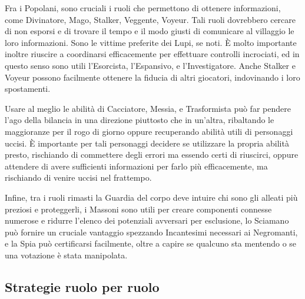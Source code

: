 \documentclass[a4paper,10pt]{article}
\begin{document}
Fra i Popolani, sono cruciali i ruoli che permettono di ottenere informazioni, come Divinatore, Mago, Stalker, Veggente, Voyeur. Tali ruoli dovrebbero cercare di non esporsi e di trovare il tempo e il modo giusti di comunicare al villaggio le loro informazioni. Sono le vittime preferite dei Lupi, se noti. È molto importante inoltre riuscire a coordinarsi efficacemente per effettuare controlli incrociati, ed in questo senso sono utili l'Esorcista, l'Espansivo, e l'Investigatore. Anche Stalker e Voyeur possono facilmente ottenere la fiducia di altri giocatori, indovinando i loro spostamenti.

Usare al meglio le abilità di Cacciatore, Messia, e Trasformista può far pendere l'ago della bilancia in una direzione piuttosto che in un'altra, ribaltando le maggioranze per il rogo di giorno oppure recuperando abilità utili di personaggi uccisi. È importante per tali personaggi decidere se utilizzare la propria abilità presto, rischiando di commettere degli errori ma essendo certi di riuscirci, oppure attendere di avere sufficienti informazioni per farlo più efficacemente, ma rischiando di venire uccisi nel frattempo.

Infine, tra i ruoli rimasti la Guardia del corpo deve intuire chi sono gli alleati più preziosi e proteggerli, i Massoni sono utili per creare componenti connesse numerose e ridurre l'elenco dei potenziali avversari per esclusione, lo Sciamano può fornire un cruciale vantaggio spezzando Incantesimi necessari ai Negromanti, e la Spia può certificarsi facilmente, oltre a capire se qualcuno sta mentendo o se una votazione è stata manipolata.

\subsection{Strategie ruolo per ruolo}
\end{document}
